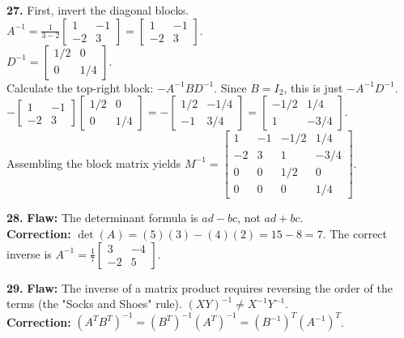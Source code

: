 \documentclass[12pt]{article}
\begin{document}
\textbf{27.} First, invert the diagonal blocks. \\
$A^{-1} = \frac{1}{3-2} \begin{bmatrix} 1 & -1 \\ -2 & 3 \end{bmatrix} = \begin{bmatrix} 1 & -1 \\ -2 & 3 \end{bmatrix}$. \\
$D^{-1} = \begin{bmatrix} 1/2 & 0 \\ 0 & 1/4 \end{bmatrix}$. \\
Calculate the top-right block: $-A^{-1} B D^{-1}$. Since $B = I_2$, this is just $-A^{-1} D^{-1}$. \\
$-\begin{bmatrix} 1 & -1 \\ -2 & 3 \end{bmatrix} \begin{bmatrix} 1/2 & 0 \\ 0 & 1/4 \end{bmatrix} = -\begin{bmatrix} 1/2 & -1/4 \\ -1 & 3/4 \end{bmatrix} = \begin{bmatrix} -1/2 & 1/4 \\ 1 & -3/4 \end{bmatrix}$. \\
Assembling the block matrix yields $M^{-1} = \begin{bmatrix} 1 & -1 & -1/2 & 1/4 \\ -2 & 3 & 1 & -3/4 \\ 0 & 0 & 1/2 & 0 \\ 0 & 0 & 0 & 1/4 \end{bmatrix}$.

\textbf{28.} \textbf{Flaw:} The determinant formula is $ad - bc$, not $ad + bc$. \\
\textbf{Correction:} $\det(A) = (5)(3) - (4)(2) = 15 - 8 = 7$. The correct inverse is $A^{-1} = \frac{1}{7} \begin{bmatrix} 3 & -4 \\ -2 & 5 \end{bmatrix}$.

\textbf{29.} \textbf{Flaw:} The inverse of a matrix product requires reversing the order of the terms (the "Socks and Shoes" rule). $(XY)^{-1} \neq X^{-1}Y^{-1}$. \\
\textbf{Correction:} $(A^T B^T)^{-1} = (B^T)^{-1} (A^T)^{-1} = (B^{-1})^T (A^{-1})^T$.
\end{document}
